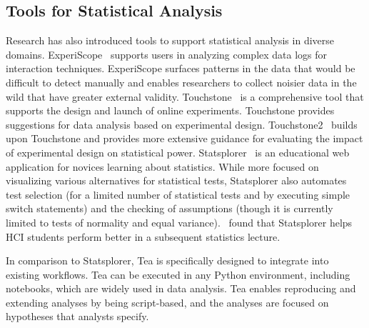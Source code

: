 \subsection{Tools for Statistical Analysis}
Research has also introduced tools to support statistical analysis in diverse
domains. ExperiScope~\cite{guimbretiere2007experiscope} supports users in
analyzing complex data logs for interaction techniques. ExperiScope surfaces
patterns in the data that would be difficult to detect manually and enables
researchers to collect noisier data in the wild that have greater external
validity. Touchstone~\cite{mackay2007touchstone} is a comprehensive tool that
supports the design and launch of online experiments. Touchstone provides
suggestions for data analysis based on experimental design.
Touchstone2~\cite{eiselmayer2019touchstone2} builds upon Touchstone and provides
more extensive guidance for evaluating the impact of experimental design on
statistical power. Statsplorer~\cite{wacharamanotham2015statsplorer} is an
educational web application for novices learning about statistics. While more
focused on visualizing various alternatives for statistical tests, Statsplorer
also automates test selection (for a limited number of statistical tests and by
executing simple switch statements) and the checking of assumptions (though it
is currently limited to tests of normality and equal
variance).~\cite{wacharamanotham2015statsplorer} found that Statsplorer helps
HCI students perform better in a subsequent statistics lecture. 

In comparison to Statsplorer, Tea is specifically designed to integrate into
existing workflows. Tea can be executed in any Python environment, including
notebooks, which are widely used in data analysis. Tea enables reproducing and
extending analyses by being script-based, and the analyses are focused on
hypotheses that analysts specify. 


\vspace{-13pt}
